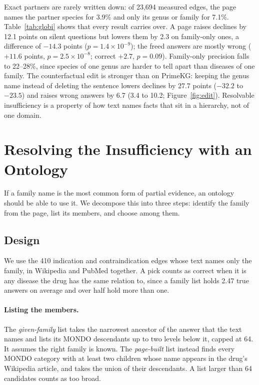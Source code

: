 \documentclass[letterpaper]{article} %
\begin{document}
Exact partners are rarely written down: of 23,694 measured edges, the page
names the partner species for 3.9\% and only its genus or family for 7.1\%.
Table~\ref{tab:globi} shows that every result carries over. A page raises
declines by 12.1 points on silent questions but lowers them by 2.3 on
family-only ones, a difference of $-14.3$ points ($p = 1.4\times10^{-9}$);
the freed answers are mostly wrong ($+11.6$ points, $p = 2.5\times10^{-8}$;
correct $+2.7$, $p = 0.09$). Family-only precision falls to 22--28\%, since
species of one genus are harder to tell apart than diseases of one family. The
counterfactual edit is stronger than on PrimeKG: keeping the genus name instead
of deleting the sentence lowers declines by 27.7 points ($-32.2$ to $-23.5$)
and raises wrong answers by 6.7 (3.4 to 10.2; Figure~\ref{fig:edit}). Resolvable insufficiency is a
property of how text names facts that sit in a hierarchy, not of one domain.

\section{Resolving the Insufficiency with an Ontology}

If a family name is the most common form of partial evidence, an ontology
should be able to use it. We decompose this into three steps: identify the
family from the page, list its members, and choose among them.

\subsection{Design}

We use the 410 indication and contraindication edges whose text names only
the family, in Wikipedia and PubMed together. A pick counts as correct when it
is any disease the drug has the same relation to, since a family list holds
2.47 true answers on average and over half hold more than one.

\paragraph{Listing the members.}
The \emph{given-family} list takes the narrowest ancestor of the answer that
the text names and lists its MONDO descendants up to two levels below it,
capped at 64. It assumes the right family is known. The \emph{page-built} list
instead finds every MONDO category with at least two children whose name
appears in the drug's Wikipedia article, and takes the union of their
descendants. A list larger than 64 candidates counts as too broad.
\end{document}
